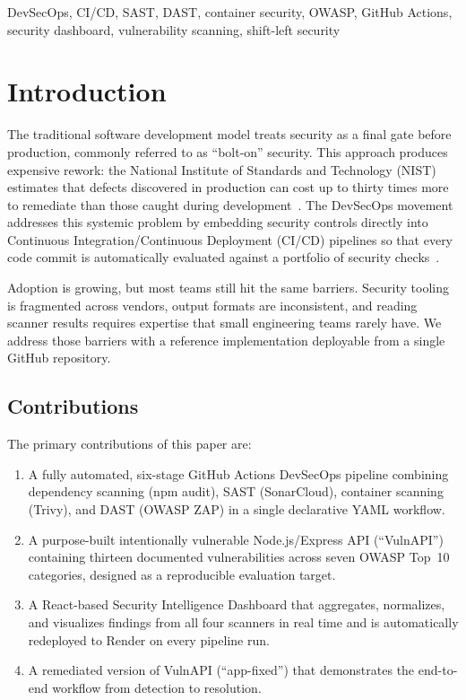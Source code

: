 \documentclass[10pt,conference]{IEEEtran}
\begin{document}
\begin{IEEEkeywords}
DevSecOps, CI/CD, SAST, DAST, container security, OWASP, GitHub Actions,
security dashboard, vulnerability scanning, shift-left security
\end{IEEEkeywords}

\section{Introduction}

The traditional software development model treats security as a final gate
before production, commonly referred to as ``bolt-on'' security.
This approach produces expensive rework: the National Institute of Standards
and Technology (NIST) estimates that defects discovered in production can cost
up to thirty times more to remediate than those caught during
development~\cite{nist2002cost}.
The DevSecOps movement addresses this systemic problem by embedding security
controls directly into Continuous Integration/Continuous Deployment (CI/CD)
pipelines so that every code commit is automatically evaluated against a
portfolio of security checks~\cite{devsecops2019}.

Adoption is growing, but most teams still hit the same barriers.
Security tooling is fragmented across vendors, output formats are inconsistent,
and reading scanner results requires expertise that small engineering teams
rarely have.
We address those barriers with a reference implementation deployable from
a single GitHub repository.

\subsection{Contributions}

The primary contributions of this paper are:

\begin{enumerate}
  \item A fully automated, six-stage GitHub Actions DevSecOps pipeline
        combining dependency scanning (npm audit), SAST (SonarCloud), container
        scanning (Trivy), and DAST (OWASP ZAP) in a single declarative YAML
        workflow.

  \item A purpose-built intentionally vulnerable Node.js/Express API
        (``VulnAPI'') containing thirteen documented vulnerabilities across seven
        OWASP Top~10 categories, designed as a reproducible evaluation target.

  \item A React-based Security Intelligence Dashboard that aggregates,
        normalizes, and visualizes findings from all four scanners in real time
        and is automatically redeployed to Render on every pipeline run.

  \item A remediated version of VulnAPI (``app-fixed'') that demonstrates
        the end-to-end workflow from detection to resolution.
\end{enumerate}
\end{document}

